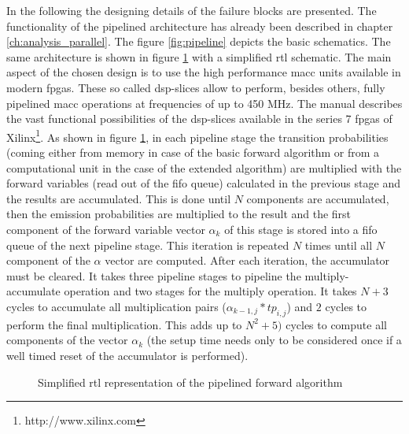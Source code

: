 \documentclass[mscthesis]{usiinfthesis}
\begin{document}
In the following the designing details of the failure blocks are presented.
The functionality of the pipelined architecture has already been described in
chapter \ref{ch:analysis_parallel}. The figure \ref{fig:pipeline} depicts the
basic schematics. The same architecture is shown in figure \ref{fig:arch_pipe}
with a simplified \gls{rtl} schematic. The main aspect of the chosen design is
to use the high performance \gls{macc} units available in modern \glspl{fpga}.
These so called \gls{dsp}-slices allow to perform, besides others, fully
pipelined \gls{macc} operations at frequencies of up to 450 MHz. The manual
\cite{xilinx_DSP} describes the vast functional possibilities of the
\gls{dsp}-slices available in the series 7 \glspl{fpga} of
Xilinx\footnote{http://www.xilinx.com}. As shown in figure \ref{fig:arch_pipe},
in each pipeline stage the transition probabilities (coming either from memory
in case of the basic forward algorithm or from a computational unit in the case
of the extended algorithm) are multiplied with the forward variables (read out
of the fifo queue) calculated in the previous stage and the results are
accumulated. This is done until $N$ components are accumulated, then the
emission probabilities are multiplied to the result and the first component of
the forward variable vector $\alpha_k$ of this stage is stored into a fifo
queue of the next pipeline stage. This iteration is repeated $N$ times until
all $N$ component of the $\alpha$ vector are computed. After each iteration,
the accumulator must be cleared. It takes three pipeline stages to pipeline the
multiply- accumulate operation and two stages for the multiply operation. It
takes $N+3$ cycles to accumulate all multiplication pairs ($\alpha_{k-1, j}
* tp_{i,j}$) and $2$ cycles to perform the final multiplication. This adds up
to $N^2+5)$ cycles to compute all components of the vector $\alpha_k$ (the
setup time needs only to be considered once if a well timed reset of the
accumulator is performed).

\begin{figure}
    \centering
    
    \caption{Simplified \acrshort{rtl} representation of the pipelined forward algorithm}
    \label{fig:arch_pipe}
\end{figure}
\end{document}

